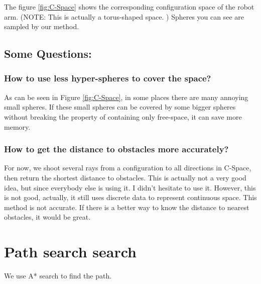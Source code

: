 \documentclass{article}
\begin{document}
    The figure \ref{fig:C-Space} shows the corresponding configuration space of the robot arm. (NOTE: This is actually a torus-shaped space. ) Spheres you can see are sampled by our method.

	\subsection{Some Questions:}
 		\subsubsection{How to use less hyper-spheres to cover the space?}
    As can be seen in Figure \ref{fig:C-Space}, in some places there are many annoying small spheres. If these small spheres can be covered by some bigger spheres without breaking the property of containing only free-space, it can save more memory.  

 		\subsubsection{How to get the distance to obstacles more accurately?}
    For now, we shoot several rays from a configuration to all directions in C-Space, then return the shortest distance to obstacles. This is actually not a very good idea, but since everybody else is using it. I didn't hesitate to use it. However, this is not good, actually, it still uses discrete data to represent continuous space. This method is not accurate. If there is a better way to know the distance to nearest obstacles, it would be great.

\section{Path search search}
  We use A* search to find the path.
\end{document}
